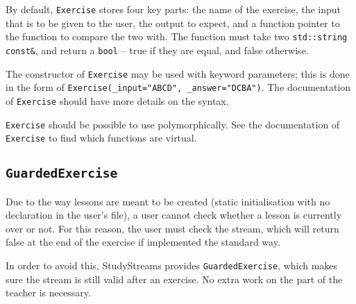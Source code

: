 \documentclass[12pt,a4paper]{report}
\begin{document}
		By default, \texttt{Exercise} stores four key parts:  the name of the
		exercise, the input that is to be given to the user, the output to
		expect, and a function pointer to the function to compare the two with.
		The function must take two \texttt{std::string const&}, and return a
		\texttt{bool} -- true if they are equal, and false otherwise.

		The constructor of \texttt{Exercise} may be used with keyword parameters;
		this is done in the form of \texttt{Exercise(\_input="ABCD", \_answer="DCBA")}.
		The documentation of \texttt{Exercise} should have more details on the
		syntax.

		\texttt{Exercise} should be possible to use polymorphically.  See the
		documentation of \texttt{Exercise} to find which functions are virtual.

		\subsection{\texttt{GuardedExercise}}
			Due to the way lessons are meant to be created (static initialisation
			with no declaration in the user's file), a user cannot check whether a
			lesson is currently over or not.  For this reason, the user must check
			the stream, which will return false at the end of the exercise if
			implemented the standard way.

			In order to avoid this, StudyStreams provides \texttt{GuardedExercise},
			which makes sure the stream is still valid after an exercise.  No extra
			work on the part of the teacher is necessary.



\end{document}
